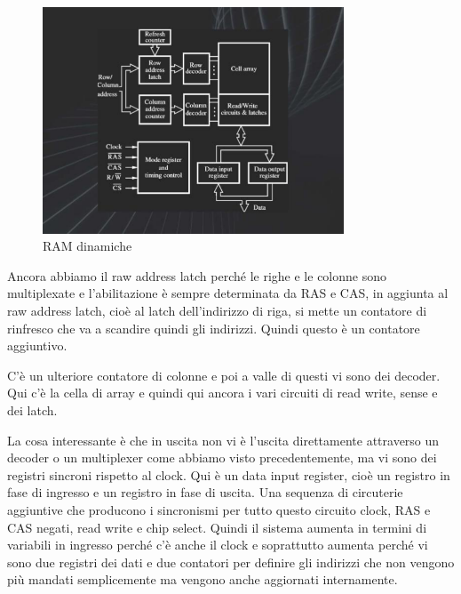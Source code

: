 \FloatBarrier
\begin{figure}[H]
  \centering
  \includegraphics[width=0.80\textwidth,
                    trim=40 30 20 40, %
                    clip]
                    {images/Lez04_p05_fig_06.png}
  \caption{RAM dinamiche}
  \label{fig:Lez04_p05_fig_06}
\end{figure}
\FloatBarrier
\noindent

Ancora abbiamo il raw address latch perché le righe e le colonne sono multiplexate e l'abilitazione è sempre determinata da RAS e CAS, in aggiunta al raw address latch, cioè al latch dell'indirizzo di riga, si mette un contatore di rinfresco che va a scandire quindi gli indirizzi. Quindi questo è un contatore aggiuntivo.

C'è un ulteriore contatore di colonne e poi a valle di questi vi sono dei decoder. Qui c'è la cella di array e quindi qui ancora i vari circuiti di read write, sense e dei latch.

La cosa interessante è che in uscita non vi è l'uscita direttamente attraverso un decoder o un multiplexer come abbiamo visto precedentemente, ma vi sono dei registri sincroni rispetto al clock.
Qui è un data input register, cioè un registro in fase di ingresso e un registro in fase di uscita.
Una sequenza di circuterie aggiuntive che producono i sincronismi per tutto questo circuito clock, RAS e CAS negati, read write e chip select.
Quindi il sistema aumenta in termini di variabili in ingresso perché c'è anche il clock e soprattutto aumenta perché vi sono due registri dei dati e due contatori per definire gli indirizzi che non vengono più mandati semplicemente ma vengono anche aggiornati internamente.

